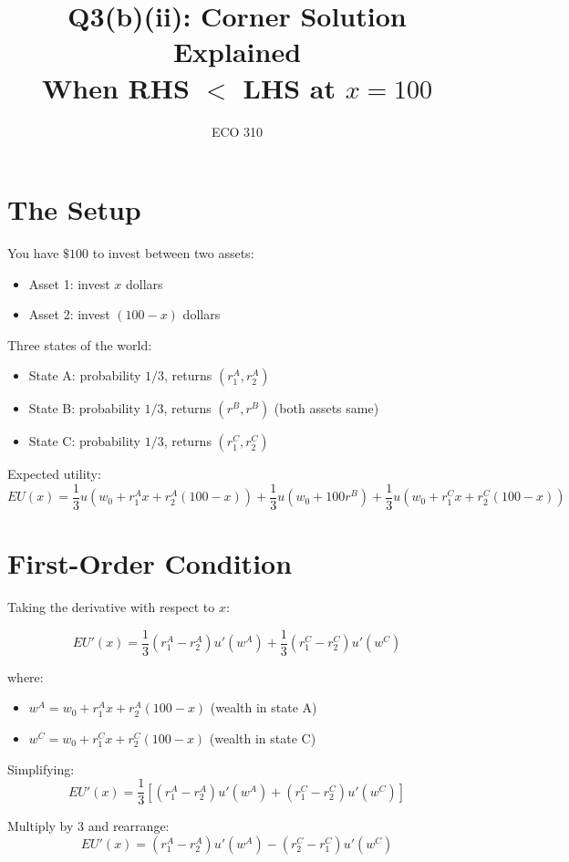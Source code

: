 \documentclass[12pt]{article}
\title{\LARGE Q3(b)(ii): Corner Solution Explained\\When RHS $<$ LHS at $x = 100$}
\author{ECO 310}
\date{}
\begin{document}
\maketitle

\section*{The Setup}

You have $\$100$ to invest between two assets:
\begin{itemize}
    \item Asset 1: invest $x$ dollars
    \item Asset 2: invest $(100-x)$ dollars
\end{itemize}

Three states of the world:
\begin{itemize}
    \item State A: probability $1/3$, returns $(r_1^A, r_2^A)$
    \item State B: probability $1/3$, returns $(r^B, r^B)$ (both assets same)
    \item State C: probability $1/3$, returns $(r_1^C, r_2^C)$
\end{itemize}

Expected utility:
$$EU(x) = \frac{1}{3}u(w_0 + r_1^A x + r_2^A(100-x)) + \frac{1}{3}u(w_0 + 100r^B) + \frac{1}{3}u(w_0 + r_1^C x + r_2^C(100-x))$$

\section*{First-Order Condition}

Taking the derivative with respect to $x$:

$$EU'(x) = \frac{1}{3}(r_1^A - r_2^A)u'(w^A) + \frac{1}{3}(r_1^C - r_2^C)u'(w^C)$$

where:
\begin{itemize}
    \item $w^A = w_0 + r_1^A x + r_2^A(100-x)$ (wealth in state A)
    \item $w^C = w_0 + r_1^C x + r_2^C(100-x)$ (wealth in state C)
\end{itemize}

Simplifying:
$$EU'(x) = \frac{1}{3}\left[(r_1^A - r_2^A)u'(w^A) + (r_1^C - r_2^C)u'(w^C)\right]$$

Multiply by 3 and rearrange:
$$EU'(x) = (r_1^A - r_2^A)u'(w^A) - (r_2^C - r_1^C)u'(w^C)$$

\newpage
\end{document}
